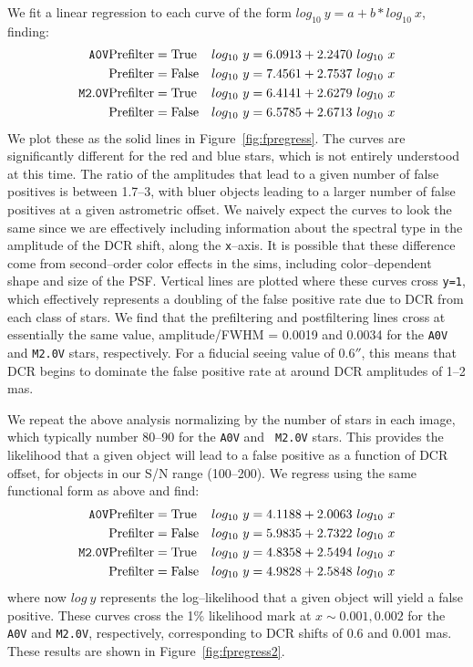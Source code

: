 \documentclass[prd, nofootinbib, floatfix, 11pt, tightenlines, times]{article}
\begin{document}
We fit a linear regression to each curve of the form $log_{10}~y = a +
b * log_{10}~x$, finding:
\begin{eqnarray}
{\tt A0V}   & {\rm Prefilter=True}  & log_{10}~y = 6.0913 + 2.2470 ~log_{10}~x \\ \nonumber
            & {\rm Prefilter=False} & log_{10}~y = 7.4561 + 2.7537 ~log_{10}~x \\ \nonumber
{\tt M2.0V} & {\rm Prefilter=True}  & log_{10}~y = 6.4141 + 2.6279 ~log_{10}~x \\ \nonumber
            & {\rm Prefilter=False} & log_{10}~y = 6.5785 + 2.6713 ~log_{10}~x 
\end{eqnarray}
We plot these as the solid lines in Figure~\ref{fig:fpregress}.  The
curves are significantly different for the red and blue stars, which
is not entirely understood at this time.  The ratio of the amplitudes
that lead to a given number of false positives is between 1.7--3, with
bluer objects leading to a larger number of false positives at a given
astrometric offset.  We naively expect the curves to look the same
since we are effectively including information about the spectral type
in the amplitude of the DCR shift, along the {\tt x}--axis.  It is
possible that these difference come from second--order color effects
in the sims, including color--dependent shape and size of the PSF.
Vertical lines are plotted where these curves cross {\tt y=1}, which
effectively represents a doubling of the false positive rate due to
DCR from each class of stars.  We find that the prefiltering and
postfiltering lines cross at essentially the same value,
amplitude/FWHM = 0.0019 and 0.0034 for the {\tt A0V} and {\tt M2.0V}
stars, respectively.  For a fiducial seeing value of $0.6''$, this
means that DCR begins to dominate the false positive rate at around
DCR amplitudes of 1--2 mas.

We repeat the above analysis normalizing by the number of stars in
each image, which typically number 80--90 for the {\tt A0V} and {\tt
  M2.0V} stars.  This provides the likelihood that a given object will
lead to a false positive as a function of DCR offset, for objects in
our S/N range (100--200).  We regress using the same functional form
as above and find:
\begin{eqnarray}
{\tt A0V}   & {\rm Prefilter=True}  & log_{10}~y = 4.1188 + 2.0063 ~log_{10}~x \\ \nonumber
            & {\rm Prefilter=False} & log_{10}~y = 5.9835 + 2.7322 ~log_{10}~x \\ \nonumber
{\tt M2.0V} & {\rm Prefilter=True}  & log_{10}~y = 4.8358 + 2.5494 ~log_{10}~x \\ \nonumber
            & {\rm Prefilter=False} & log_{10}~y = 4.9828 + 2.5848 ~log_{10}~x 
\end{eqnarray}
where now $log~y$ represents the log--likelihood that a given object
will yield a false positive.  These curves cross the 1\% likelihood
mark at $x \sim 0.001, 0.002$ for the {\tt A0V} and {\tt M2.0V},
respectively, corresponding to DCR shifts of 0.6 and 0.001 mas.  These
results are shown in Figure~\ref{fig:fpregress2}.
\end{document}
